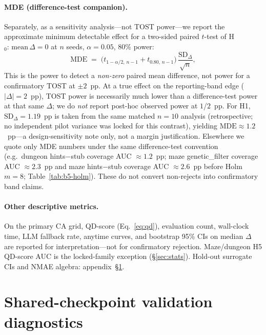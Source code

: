 \documentclass[preprint,12pt]{elsarticle}
\begin{document}
\paragraph{MDE (difference-test companion).}
Separately, as a sensitivity analysis---not TOST power---we report the approximate minimum detectable effect for a two-sided paired $t$-test of H$_0{:}\,\mathrm{mean}\,\Delta{=}0$ at $n$ seeds, $\alpha{=}0.05$, 80\% power:
\begin{equation}
  \mathrm{MDE} \;=\; \bigl(t_{1-\alpha/2,\,n-1} + t_{0.80,\,n-1}\bigr)\,\frac{\mathrm{SD}_{\Delta}}{\sqrt{n}},
  \label{eq:mde}
\end{equation}
This is the power to detect a \emph{non-zero} paired mean difference, not power for a confirmatory TOST at $\pm 2$~pp. At a true effect on the reporting-band edge ($|\Delta|{=}2$~pp), TOST power is necessarily much lower than a difference-test power at that same $\Delta$; we do \emph{not} report post-hoc observed power at $1$/$2$~pp. For H1, $\mathrm{SD}_{\Delta}{=}1.19$~pp is taken from the same matched $n{=}10$ analysis (retrospective; no independent pilot variance was locked for this contrast), yielding $\mathrm{MDE}{\approx}1.2$~pp---a design-sensitivity note only, not a margin justification. Elsewhere we quote only MDE numbers under the same difference-test convention (e.g.\ dungeon hints$-$stub coverage AUC ${\approx}1.2$~pp; maze genetic\_filter coverage AUC ${\approx}2.3$~pp and maze hints$-$stub coverage AUC ${\approx}2.6$~pp before Holm $m{=}8$; Table~\ref{tab:b5-holm}). These do not convert non-rejects into confirmatory band claims.

\paragraph{Other descriptive metrics.}
On the primary CA grid, QD-score (Eq.~\eqref{eq:qd}), evaluation count, wall-clock time, LLM fallback rate, anytime curves, and bootstrap 95\% CIs on median $\Delta$ are reported for interpretation---not for confirmatory rejection. Maze/dungeon H5 QD-score AUC is the locked-family exception (\S\ref{sec:stats}). Hold-out surrogate CIs and NMAE algebra: appendix~\S\ref{sec:checkpoint-appendix}.

\section{Shared-checkpoint validation diagnostics}
\label{sec:checkpoint-appendix}
\label{sec:checkpoint}
\end{document}
